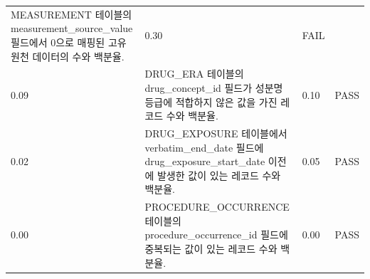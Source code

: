 \documentclass[10.5pt]{book}
\theoremstyle{definition}
\theoremstyle{definition}
\theoremstyle{definition}
\theoremstyle{remark}
\begin{document}
\begin{longtable}[]{@{}llll@{}}
\begin{minipage}[t]{0.47\columnwidth}
MEASUREMENT 테이블의 measurement\_source\_value 필드에서 0으로 매핑된
고유 원천 데이터의 수와 백분율.\strut
\end{minipage} & \begin{minipage}[t]{0.10\columnwidth}\raggedright\strut
0.30\strut
\end{minipage} & \begin{minipage}[t]{0.07\columnwidth}\raggedright\strut
FAIL\strut
\end{minipage}\tabularnewline
\begin{minipage}[t]{0.12\columnwidth}\raggedright\strut
0.09\strut
\end{minipage} & \begin{minipage}[t]{0.47\columnwidth}\raggedright\strut
DRUG\_ERA 테이블의 drug\_concept\_id 필드가 성분명 등급에 적합하지 않은
값을 가진 레코드 수와 백분율.\strut
\end{minipage} & \begin{minipage}[t]{0.10\columnwidth}\raggedright\strut
0.10\strut
\end{minipage} & \begin{minipage}[t]{0.07\columnwidth}\raggedright\strut
PASS\strut
\end{minipage}\tabularnewline
\begin{minipage}[t]{0.12\columnwidth}\raggedright\strut
0.02\strut
\end{minipage} & \begin{minipage}[t]{0.47\columnwidth}\raggedright\strut
DRUG\_EXPOSURE 테이블에서 verbatim\_end\_date 필드에
drug\_exposure\_start\_date 이전에 발생한 값이 있는 레코드 수와
백분율.\strut
\end{minipage} & \begin{minipage}[t]{0.10\columnwidth}\raggedright\strut
0.05\strut
\end{minipage} & \begin{minipage}[t]{0.07\columnwidth}\raggedright\strut
PASS\strut
\end{minipage}\tabularnewline
\begin{minipage}[t]{0.12\columnwidth}\raggedright\strut
0.00\strut
\end{minipage} & \begin{minipage}[t]{0.47\columnwidth}\raggedright\strut
PROCEDURE\_OCCURRENCE 테이블의 procedure\_occurrence\_id 필드에 중복되는
값이 있는 레코드 수와 백분율.\strut
\end{minipage} & \begin{minipage}[t]{0.10\columnwidth}\raggedright\strut
0.00\strut
\end{minipage} & \begin{minipage}[t]{0.07\columnwidth}\raggedright\strut
PASS\strut
\end{minipage}\tabularnewline
\bottomrule
\end{longtable}
\end{document}

